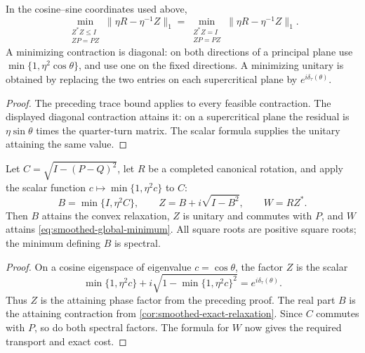 \begin{corollary}
\label{cor:smoothed-exact-relaxation}
In the cosine--sine coordinates used above,
\[
 \min_{\substack{Z^*Z\leq I\\ZP=PZ}}\|\eta R-\eta^{-1}Z\|_1
 =\min_{\substack{Z^*Z=I\\ZP=PZ}}\|\eta R-\eta^{-1}Z\|_1.
\]
A minimizing contraction is diagonal: on both directions of a principal
plane use $\min\{1,\eta^2\cos\theta\}$, and use one on the fixed
directions. A minimizing unitary is obtained by replacing the two entries
on each supercritical plane by $e^{i\delta_\tau(\theta)}$.
\end{corollary}

\begin{proof}
The preceding trace bound applies to every feasible contraction. The
displayed diagonal contraction attains it: on a supercritical plane
the residual is $\eta\sin\theta$ times the quarter-turn matrix.
The scalar formula supplies the unitary attaining the same value.
\end{proof}

\begin{corollary}
\label{cor:smoothed-spectral-optimizer}
Let $C=\sqrt{I-(P-Q)^2}$, let $R$ be a completed canonical rotation,
and apply the scalar function $c\mapsto\min\{1,\eta^2c\}$ to $C$:
\[
 B=\min\{I,\eta^2C\},\qquad
 Z=B+i\sqrt{I-B^2},\qquad W=RZ^*.
\]
Then $B$ attains the convex relaxation, $Z$ is unitary and commutes
with $P$, and $W$ attains \cref{eq:smoothed-global-minimum}.
All square roots are positive square roots; the minimum defining $B$
is spectral.
\end{corollary}

\begin{proof}
On a cosine eigenspace of eigenvalue $c=\cos\theta$, the factor $Z$
is the scalar
\[
 \min\{1,\eta^2c\}
   +i\sqrt{1-\min\{1,\eta^2c\}^2}
 =e^{i\delta_\tau(\theta)}.
\]
Thus $Z$ is the attaining phase factor from the preceding proof.
The real part $B$ is the attaining contraction from
\cref{cor:smoothed-exact-relaxation}. Since $C$ commutes with $P$,
so do both spectral factors. The formula for $W$ now gives the
required transport and exact cost.
\end{proof}


